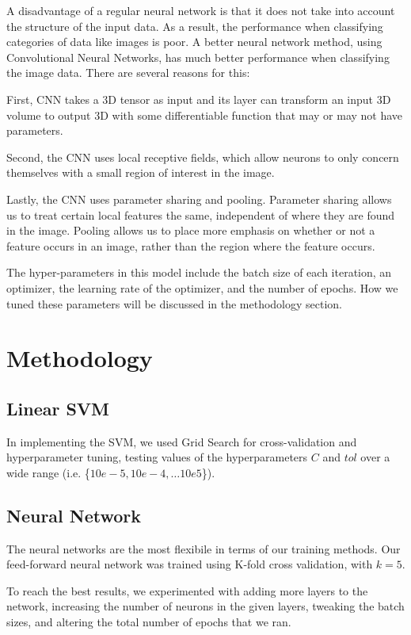 \documentclass[conference]{IEEEtran}
\begin{document}
A disadvantage of a regular neural network is that it does not take into account the structure of the input data. As a result, the performance when classifying categories of data like images is poor. 
A better neural network method, using Convolutional Neural Networks, has much better performance when classifying the image data. There are several reasons for this:

First, CNN takes a 3D tensor as input and its layer can transform an input 3D volume to output 3D with some differentiable function that may or may not have parameters. 

Second, the CNN uses local receptive fields, which allow neurons to only concern themselves with a small region of interest in the image. 

Lastly, the CNN uses parameter sharing and pooling. Parameter sharing allows us to treat certain local features the same, independent of where they are found in the image. Pooling allows us to place more emphasis on whether or not a feature occurs in an image, rather than the region where the feature occurs.

The hyper-parameters in this model include the batch size of each iteration, an optimizer, the learning rate of the optimizer, and the number of epochs. How we tuned these parameters will be discussed in the methodology section.

\section{\textbf{Methodology}}

\subsection{Linear SVM}

In implementing the SVM, we used Grid Search for cross-validation and hyperparameter tuning, testing values of the hyperparameters $C$ and $tol$ over a wide range (i.e. \{$10e-5, 10e-4, \ldots 10e5$\}).

\subsection{Neural Network}

The neural networks are the most flexibile in terms of our training methods. Our feed-forward neural network was trained using K-fold cross validation, with $k = 5$.

To reach the best results, we experimented with adding more layers to the network, increasing the number of neurons in the given layers, tweaking the batch sizes, and altering the total number of epochs that we ran.
\end{document}
